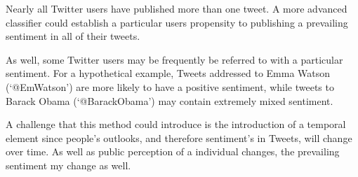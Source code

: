 \documentclass[final,3p,12pt]{elsarticle}
\begin{document}
Nearly all Twitter users have published more than one tweet. A more advanced
classifier could establish a particular users propensity to publishing a
prevailing sentiment in all of their tweets.

As well, some Twitter users may be frequently be referred to with a particular
sentiment. For a hypothetical example, Tweets addressed to Emma Watson
(`@EmWatson') are more likely to have a positive sentiment, while tweets to
Barack Obama (`@BarackObama') may contain extremely mixed sentiment.

A challenge that this method could introduce is the introduction of a temporal
element since people's outlooks, and therefore sentiment's in Tweets, will
change over time. As well as public perception of a individual changes, the
prevailing sentiment my change as well.


\nocite{*}


\end{document}
